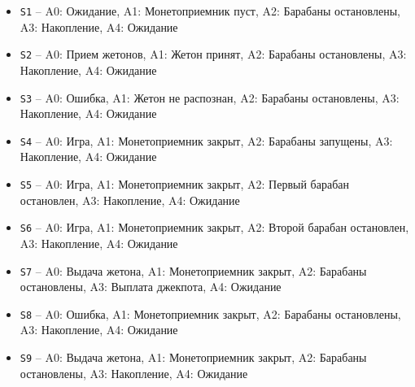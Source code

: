 \begin{itemize}
  \item[] \texttt{S1} -- A0: Ожидание, A1: Монетоприемник пуст, A2: Барабаны остановлены, A3: Накопление, A4: Ожидание
  \item[] \texttt{S2} -- A0: Прием жетонов, A1: Жетон принят, A2: Барабаны остановлены, A3: Накопление, A4: Ожидание
  \item[] \texttt{S3} -- A0: Ошибка, A1: Жетон не распознан, A2: Барабаны остановлены, A3: Накопление, A4: Ожидание
  \item[] \texttt{S4} -- A0: Игра, A1: Монетоприемник закрыт, A2: Барабаны запущены, A3: Накопление, A4: Ожидание
  \item[] \texttt{S5} -- A0: Игра, A1: Монетоприемник закрыт, A2: Первый барабан остановлен, A3: Накопление, A4: Ожидание
  \item[] \texttt{S6} -- A0: Игра, A1: Монетоприемник закрыт, A2: Второй барабан остановлен, A3: Накопление, A4: Ожидание
  \item[] \texttt{S7} -- A0: Выдача жетона, A1: Монетоприемник закрыт, A2: Барабаны остановлены, A3: Выплата джекпота, A4: Ожидание
  \item[] \texttt{S8} -- A0: Ошибка, A1: Монетоприемник закрыт, A2: Барабаны остановлены, A3: Накопление, A4: Ожидание
  \item[] \texttt{S9} -- A0: Выдача жетона, A1: Монетоприемник закрыт, A2: Барабаны остановлены, A3: Накопление, A4: Ожидание
\end{itemize}
